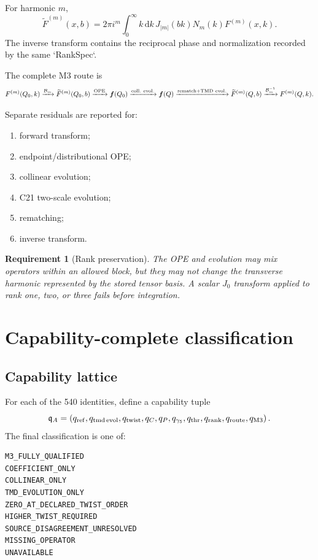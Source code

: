 \documentclass[11pt]{article}
\newtheorem{requirement}[definition]{Requirement}
\newcommand{\dd}{\mathrm{d}}
\begin{document}
For harmonic \(m\),
\begin{equation}
 \widetilde F^{(m)}(x,b)
 =
 2\pi i^m
 \int_0^\infty k\,\dd k\,
 J_{|m|}(bk)
 N_m(k)
 F^{(m)}(x,k).
 \label{eq:rank-transform}
\end{equation}
The inverse transform contains the reciprocal phase and normalization recorded by the same `RankSpec`.

The complete M3 route is
\begin{equation}
 F^{(m)}(Q_0,k)
 \xrightarrow{\mathcal B_m}
 \widetilde F^{(m)}(Q_0,b)
 \xrightarrow{\rm OPE}
 \bm f(Q_0)
 \xrightarrow{\rm coll.\ evol.}
 \bm f(Q)
 \xrightarrow{\rm rematch+TMD\ evol.}
 \widetilde F^{(m)}(Q,b)
 \xrightarrow{\mathcal B_m^{-1}}
 F^{(m)}(Q,k).
 \label{eq:full-rank-route}
\end{equation}

Separate residuals are reported for:
\begin{enumerate}
\item forward transform;
\item endpoint/distributional OPE;
\item collinear evolution;
\item C21 two-scale evolution;
\item rematching;
\item inverse transform.
\end{enumerate}

\begin{requirement}[Rank preservation]
The OPE and evolution may mix operators within an allowed block, but they may not change the transverse harmonic represented by the stored tensor basis.  A scalar \(J_0\) transform applied to rank one, two, or three fails before integration.
\end{requirement}

\section{Capability-complete classification}
\label{sec:capability}

\subsection{Capability lattice}

For each of the 540 identities, define a capability tuple
\begin{equation}
 \mathfrak q_A=
 \left(
 q_{\rm ref},
 q_{\rm tmd\,evol},
 q_{\rm twist},
 q_C,
 q_P,
 q_{\gamma_5},
 q_{\rm thr},
 q_{\rm rank},
 q_{\rm route},
 q_{\rm M3}
 \right).
 \label{eq:capability-tuple}
\end{equation}
The final classification is one of:
\begin{verbatim}
M3_FULLY_QUALIFIED
COEFFICIENT_ONLY
COLLINEAR_ONLY
TMD_EVOLUTION_ONLY
ZERO_AT_DECLARED_TWIST_ORDER
HIGHER_TWIST_REQUIRED
SOURCE_DISAGREEMENT_UNRESOLVED
MISSING_OPERATOR
UNAVAILABLE
\end{verbatim}
\end{document}
